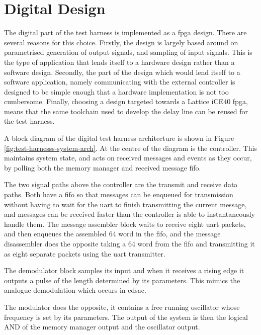\section{Digital Design} \label{sec:test-harness-dig}

The digital part of the test harness is implemented as a \gls{fpga} design. There are several reasons for this choice. Firstly, the design is largely based around on parametrised generation of output signals, and sampling of input signals. This is the type of application that lends itself to a hardware design rather than a software design. Secondly, the part of the design which would lend itself to a software application, namely communicating with the external controller is designed to be simple enough that a hardware implementation is not too cumbersome. Finally, choosing a design targeted towards a Lattice iCE40 \gls{fpga}, means that the same toolchain used to develop the delay line can be reused for the test harness.

A block diagram of the digital test harness architecture is shown in Figure \ref{fig:test-harnesss-system-arch}. At the centre of the diagram is the controller. This maintains system state, and acts on received messages and events as they occur, by polling both the memory manager and received message \gls{fifo}.

The two signal paths above the controller are the transmit and receive data paths. Both have a \gls{fifo} so that messages can be enqueued for transmission without having to wait for the \gls{uart} to finish transmitting the current message, and messages can be received faster than the controller is able to instantaneously handle them. The message assembler block waits to receive eight \gls{uart} packets, and then enqueues the assembled \SI{64}{\bit} word in the \gls{fifo}, and the message disassembler does the opposite taking a \SI{64}{\bit} word from the \gls{fifo} and transmitting it as eight separate packets using the \gls{uart} transmitter.

The demodulator block samples its input and when it receives a rising edge it outputs a pulse of the length determined by its parameters. This mimics the analogue demodulation which occurs in \gls{edsac}.

The modulator does the opposite, it contains a free running oscillator whose frequency is set by its parameters. The output of the system is then the logical AND of the memory manager output and the oscillator output.

